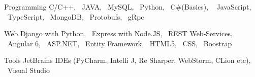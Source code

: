 


\begin{cvskills}

\vspace{2pt}
\cvskill
{Programming} %
{C/C++, ~JAVA, ~MySQL, ~Python, ~C\#(Basics), ~ JavaScript, ~TypeScript, ~MongoDB, ~Protobufs, ~gRpc} %

\vspace{2pt}
\cvskill
{Web} %
{Django with Python, ~Express with Node.JS, ~REST Web-Services, ~Angular 6, ~ASP.NET, ~Entity Framework, \newline ~HTML5, ~CSS, ~Boostrap} %

\vspace{-2pt}
\cvskill
{Tools} %
{JetBrains IDEs (PyCharm, Intelli J, Re Sharper, WebStorm, CLion etc), ~Visual Studio } %


\end{cvskills}